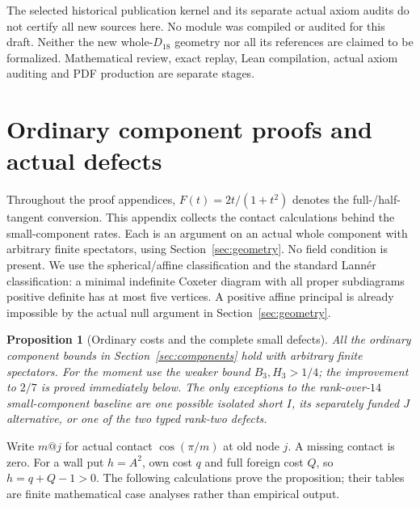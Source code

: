 \documentclass[11pt]{article}
\newtheorem{proposition}[theorem]{Proposition}
\theoremstyle{definition}
\theoremstyle{remark}
\begin{document}
The selected historical publication kernel and its separate
actual axiom audits do not certify all new sources here.
No module was compiled or audited for this draft.
Neither the new whole-\(D_{18}\) geometry nor all its
references are claimed to be formalized. Mathematical
review, exact replay, Lean compilation, actual axiom
auditing and PDF production are separate stages.

\appendix

\section{Ordinary component proofs and actual defects}
\label{app:ordinary}
Throughout the proof appendices, \(F(t)=2t/(1+t^2)\) denotes
the full-/half-tangent conversion.
This appendix collects the contact calculations behind the small-component
rates. Each is an argument on an actual whole component with arbitrary
finite spectators, using Section~\ref{sec:geometry}. No field condition
is present. We use the spherical/affine classification and the standard
Lann\'er classification: a minimal indefinite Coxeter diagram with all
proper subdiagrams positive definite has at most five vertices.
A positive affine principal is already impossible by the actual null
argument in Section~\ref{sec:geometry}.

\begin{proposition}[Ordinary costs and the complete small defects]
\label{app:prop:ordinary}
All the ordinary component bounds in Section~\ref{sec:components}
hold with arbitrary finite spectators. For the moment use the weaker
bound \(B_3,H_3>1/4\); the improvement to \(2/7\) is proved immediately
below. The only exceptions to the rank-over-\(14\) small-component
baseline are one possible isolated short \(I\), its separately funded
\(J\) alternative, or one of the two typed rank-two defects.
\end{proposition}
Write \(m@j\) for actual contact \(\cos(\pi/m)\) at old node \(j\).
A missing contact is zero. For a wall put \(h=A^2\), own cost
\(q\) and full foreign cost \(Q\), so \(h=q+Q-1>0\).
The following calculations prove the proposition; their tables are
finite mathematical case analyses rather than empirical output.
\end{document}
